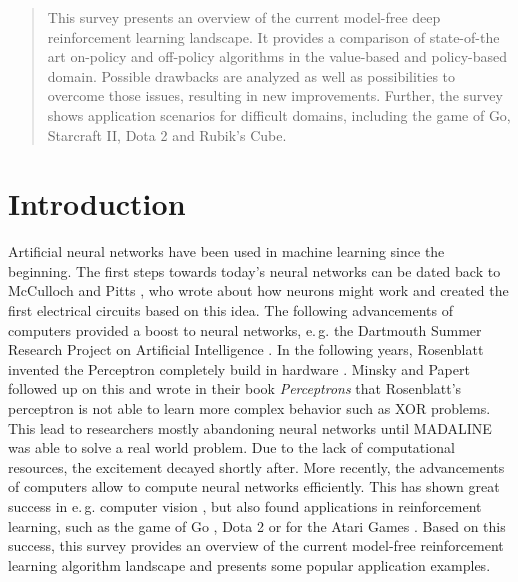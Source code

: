     \date{Received: date / Accepted: date}

    \maketitle
    \begin{abstract}
		This survey presents an overview of the current model-free deep reinforcement learning landscape. 
		It provides a comparison of state-of-the art on-policy and off-policy algorithms in the value-based and policy-based domain.
		Possible drawbacks are analyzed as well as possibilities to overcome those issues, resulting in new improvements.
		Further, the survey shows application scenarios for difficult domains, including the game of Go, Starcraft II, Dota 2 and Rubik's Cube.
    \end{abstract}

    \section{Introduction \label{sec:intro}}
    Artificial neural networks have been used in machine learning since the beginning. 
    The first steps towards today's neural networks can be dated back to McCulloch and Pitts \cite{McCulloch1943}, who wrote about how neurons might work and created the first electrical circuits based on this idea.
    The following advancements of computers provided a boost to neural networks, e.\,g. the Dartmouth Summer Research Project on Artificial Intelligence \cite{McCarthy2006}.
    In the following years, Rosenblatt invented the Perceptron completely build in hardware \cite{Rosenblatt1958}.  
    Minsky and Papert followed up on this and wrote in their book \textit{Perceptrons} \cite{Minsky2017} that Rosenblatt's perceptron is not able to learn more complex behavior such as XOR problems.
    This lead to researchers mostly abandoning neural networks until MADALINE \cite{Winter1988} was able to solve a real world problem.
    Due to the lack of computational resources, the excitement decayed shortly after.
    More recently, the advancements of computers allow to compute neural networks efficiently.
    This has shown great success in e.\,g. computer vision \cite{Krizhevsky2012,He2016}, but also found applications in reinforcement learning, such as the game of Go \cite{Silver2017}, Dota 2 \cite{OpenAI2018} or for the Atari Games \cite{Mnih2015}.
    Based on this success, this survey provides an overview of the current model-free reinforcement learning algorithm landscape and presents some popular application examples.
    
